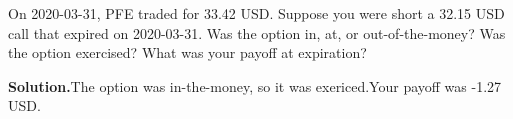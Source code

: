 \noindent On 2020-03-31, PFE traded for 33.42 USD. Suppose you were short a 32.15 USD call that expired on 2020-03-31. Was the option in, at, or out-of-the-money? Was the option exercised? What was your payoff at expiration?

\vspace{9pt} 

\textbf{Solution.}The option was in-the-money, so it was exericed.Your payoff was -1.27 USD.